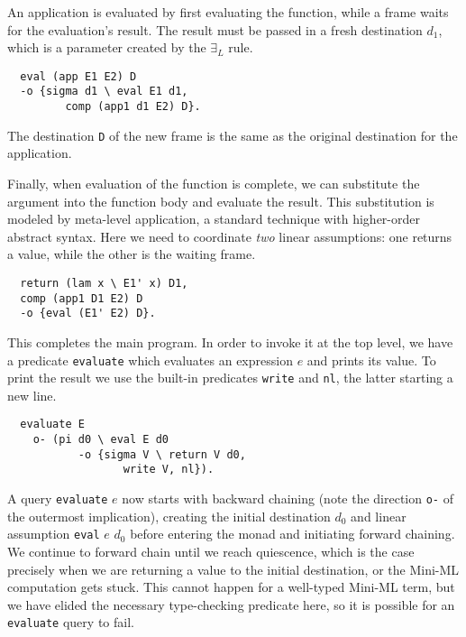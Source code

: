 \documentclass{sig-alt}
\begin{document}
An application is evaluated by first evaluating the function,
while a frame waits for the evaluation's result.
The result must be passed in a fresh destination $d_1$, which is
a parameter created by the $\exists_L$ rule.

\begin{small}\begin{verbatim}
  eval (app E1 E2) D
  -o {sigma d1 \ eval E1 d1,
         comp (app1 d1 E2) D}.
\end{verbatim}\end{small}
\noindent
The destination \verb"D" of the new frame is the same as the original
destination for the application.

Finally, when evaluation of the function is complete, we can
substitute the argument into the function body and evaluate
the result.  This substitution is modeled by meta-level application,
a standard technique with higher-order abstract syntax.
Here we need to coordinate \emph{two} linear
assumptions: one returns a value, while the other is the waiting
frame.

\begin{small}\begin{verbatim}
  return (lam x \ E1' x) D1,
  comp (app1 D1 E2) D
  -o {eval (E1' E2) D}.
\end{verbatim}\end{small}

This completes the main program.  In order to invoke it
at the top level, we have a predicate \verb"evaluate"
which evaluates an expression $e$ and prints its value.
To print the result we use the built-in predicates \verb"write"
and \verb"nl", the latter starting a new line.

\begin{small}\begin{verbatim}
  evaluate E
    o- (pi d0 \ eval E d0
           -o {sigma V \ return V d0,
                  write V, nl}).
\end{verbatim}\end{small}

A query \verb"evaluate" $e$ now starts with backward chaining (note the
direction \verb"o-" of the outermost implication), creating the initial
destination $d_0$ and linear assumption \verb"eval" $e$ $d_0$ before
entering the monad and initiating forward chaining.  We continue to
forward chain until we reach quiescence, which is the case precisely
when we are returning a value to the initial destination, or the Mini-ML
computation gets stuck.  This cannot happen for a well-typed Mini-ML
term, but we have elided the necessary
type-checking predicate here, so it is possible for an \verb"evaluate"
query to fail.
\end{document}
